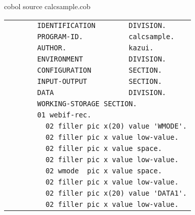 \vspace{1em}
{\gt cobol source} calcsample.cob

{\footnotesize
\begin{tabular}{|l|}
\hline
\vspace{-0.4em}\verb!       IDENTIFICATION        DIVISION.!\\
\vspace{-0.4em}\verb!       PROGRAM-ID.           calcsample.!\\
\vspace{-0.4em}\verb!       AUTHOR.               kazui.!\\
\vspace{-0.4em}\verb!       ENVIRONMENT           DIVISION.!\\
\vspace{-0.4em}\verb!       CONFIGURATION         SECTION.!\\
\vspace{-0.4em}\verb!       INPUT-OUTPUT          SECTION.!\\
\vspace{-0.4em}\verb!       DATA                  DIVISION.!\\
\vspace{-0.4em}\verb!       WORKING-STORAGE SECTION. !\\
\vspace{-0.4em}\verb!       01 webif-rec.!\\
\vspace{-0.4em}\verb!         02 filler pic x(20) value 'WMODE'.!\\
\vspace{-0.4em}\verb!         02 filler pic x value low-value.!\\
\vspace{-0.4em}\verb!         02 filler pic x value space.!\\
\vspace{-0.4em}\verb!         02 filler pic x value low-value.!\\
\vspace{-0.4em}\verb!         02 wmode  pic x value space.!\\
\vspace{-0.4em}\verb!         02 filler pic x value low-value.!\\
\vspace{-0.4em}\verb!         02 filler pic x(20) value 'DATA1'.!\\
\vspace{-0.4em}\verb!         02 filler pic x value low-value.!\\

\end{tabular}}
